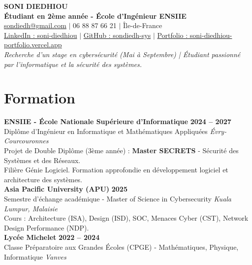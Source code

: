 \documentclass[10pt, a4paper]{article}
\begin{document}
\begin{center}
    {\Huge \bfseries SONI DIEDHIOU} \\
    \vspace{4pt}
    {\large \bfseries Étudiant en 2ème année - École d'Ingénieur ENSIIE} \\
    \vspace{6pt}
    \small
    \href{mailto:sondiedh@gmail.com}{sondiedh@gmail.com} $|$ 06 88 87 66 21 $|$ Île-de-France \\
    \vspace{2pt}
    \href{https://www.linkedin.com/in/soni-diedhiou-30b291348}{LinkedIn : soni-diedhiou} $|$ 
    \href{https://github.com/sondiedh-sys}{GitHub : sondiedh-sys} $|$ 
    \href{https://soni-diedhiou-portfolio.vercel.app}{Portfolio : soni-diedhiou-portfolio.vercel.app} \\
    \vspace{4pt}
    \textit{Recherche d'un stage en cybersécurité (Mai à Septembre) | Étudiant passionné par l'informatique et la sécurité des systèmes.}
\end{center}

\section{Formation}
\textbf{ENSIIE - École Nationale Supérieure d'Informatique} \hfill \textbf{2024 -- 2027} \\
Diplôme d'Ingénieur en Informatique et Mathématiques Appliquées \hfill \textit{Évry-Courcouronnes} \\
Projet de Double Diplôme (3ème année) : \textbf{Master SECRETS} - Sécurité des Systèmes et des Réseaux. \\
Filière Génie Logiciel. Formation approfondie en développement logiciel et architecture des systèmes. \\

\vspace{4pt}
\textbf{Asia Pacific University (APU)} \hfill \textbf{2025} \\
Semestre d'échange académique - Master of Science in Cybersecurity \hfill \textit{Kuala Lumpur, Malaisie} \\
Cours : Architecture (ISA), Design (ISD), SOC, Menaces Cyber (CST), Network Design Performance (NDP). \\

\vspace{4pt}
\textbf{Lycée Michelet} \hfill \textbf{2022 -- 2024} \\
Classe Préparatoire aux Grandes Écoles (CPGE) - Mathématiques, Physique, Informatique \hfill \textit{Vanves} \\
\end{document}
